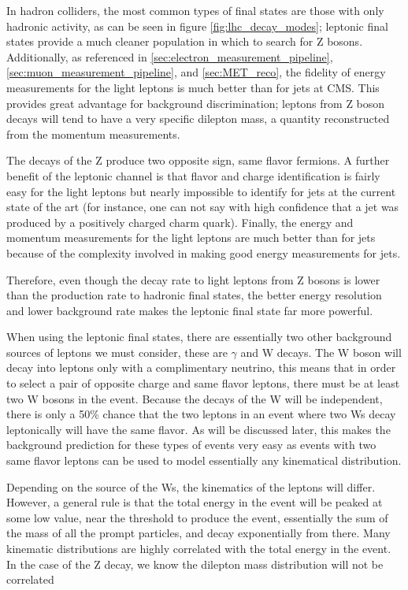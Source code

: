 In hadron colliders, the most common types of final states are those with only hadronic activity, as can be seen in figure \ref{fig:lhc_decay_modes}; leptonic final states provide a much cleaner population in which to search for Z bosons. Additionally, as referenced in \ref{sec:electron_measurement_pipeline}, \ref{sec:muon_measurement_pipeline}, and \ref{sec:MET_reco}, the fidelity of energy measurements for the light leptons is much better than for jets at CMS. This provides great advantage for background discrimination; leptons from Z boson decays will tend to have a very specific dilepton mass, a quantity reconstructed from the momentum measurements.

The decays of the Z produce two opposite sign, same flavor fermions. A further benefit of the leptonic channel is that flavor and charge identification is fairly easy for the light leptons but nearly impossible to identify for jets at the current state of the art (for instance, one can not say with high confidence that a jet was produced by a positively charged charm quark). Finally, the energy and momentum measurements for the light leptons are much better than for jets because of the complexity involved in making good energy measurements for jets.  

Therefore, even though the decay rate to light leptons from Z bosons is lower than the production rate to hadronic final states, the better energy resolution and lower background rate makes the leptonic final state far more powerful.

When using the leptonic final states, there are essentially two other background sources of leptons we must consider, these are $\gamma$ and W decays. The W boson will decay into leptons only with a complimentary neutrino, this means that in order to select a pair of opposite charge and same flavor leptons, there must be at least two W bosons in the event. Because the decays of the W will be independent, there is only a 50\% chance that the two leptons in an event where two Ws decay leptonically will have the same flavor. As will be discussed later, this makes the background prediction for these types of events very easy as events with two same flavor leptons can be used to model essentially any kinematical distribution.

Depending on the source of the Ws, the kinematics of the leptons will differ. However, a general rule is that the total energy in the event will be peaked at some low value, near the threshold to produce the event, essentially the sum of the mass of all the prompt particles, and decay exponentially from there. Many kinematic distributions are highly correlated with the total energy in the event. In the case of the Z decay, we know the dilepton mass distribution will not be correlated

